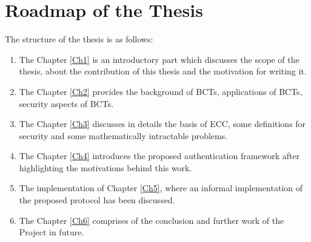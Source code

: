 \documentclass[a4paper,12pt]{report}
\begin{document}
\section{Roadmap of the Thesis}
The structure of the thesis is as follows:
\begin{enumerate}
\item The Chapter \ref{Ch1} is an introductory part which discusses the scope of the thesis, about the contribution of this
thesis and the motivation for writing it.

\item The Chapter \ref{Ch2} provides the background of BCTs, applications of BCTs, security aspects of BCTs.

\item The Chapter \ref{Ch3} discusses in details the basis of ECC, some definitions for security and some
mathematically intractable problems.

\item The Chapter \ref{Ch4} introduces the proposed authentication framework after highlighting the motivations behind this work.

\item The implementation of Chapter \ref{Ch5}, where an informal implementation of the proposed protocol has been discussed.

\item  The Chapter \ref{Ch6} comprises of the conclusion and further work of the Project in future.
\end{enumerate}

\afterpage{\null\newpage}

\end{document}

